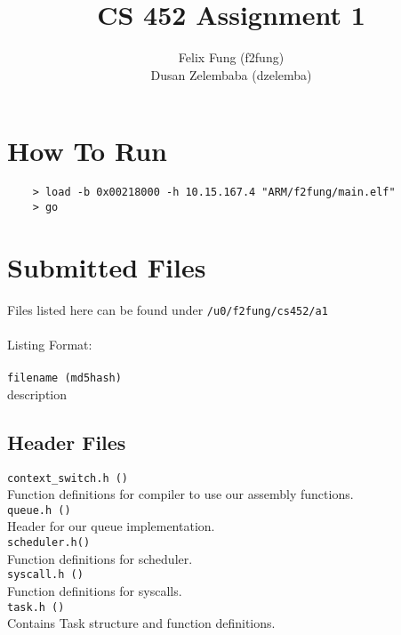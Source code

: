 \documentclass[letterpaper]{article}
\begin{document}
\title{CS 452 Assignment 1}
\author{Felix Fung (f2fung) \\ Dusan Zelembaba (dzelemba)}
\maketitle

\section{How To Run}
\begin{verbatim}
	> load -b 0x00218000 -h 10.15.167.4 "ARM/f2fung/main.elf"
	> go
\end{verbatim}

\section{Submitted Files}
Files listed here can be found under \verb!/u0/f2fung/cs452/a1!\\
\\
Listing Format:\\
\\
\verb!filename (md5hash)!\\
description

\subsection{Header Files}
\verb!context_switch.h ()!\\
Function definitions for compiler to use our assembly functions.\\
\verb!queue.h ()!\\
Header for our queue implementation.\\
\verb!scheduler.h()!\\
Function definitions for scheduler.\\
\verb!syscall.h ()!\\
Function definitions for syscalls.\\
\verb!task.h ()!\\
Contains Task structure and function definitions.\\
\end{document}
